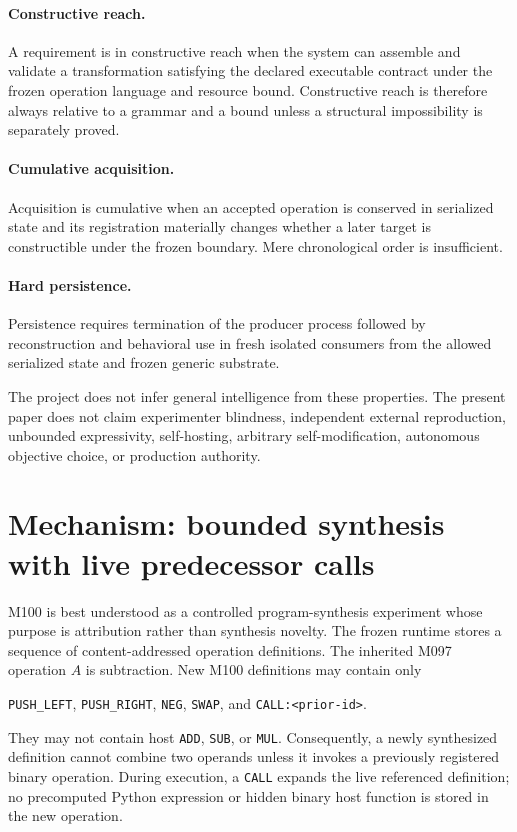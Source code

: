 \documentclass[10pt]{article}
\newcommand{\code}[1]{\texttt{#1}}
\begin{document}
\paragraph{Constructive reach.} A requirement is in constructive reach when the system can assemble and validate a transformation satisfying the declared executable contract under the frozen operation language and resource bound. Constructive reach is therefore always relative to a grammar and a bound unless a structural impossibility is separately proved.

\paragraph{Cumulative acquisition.} Acquisition is cumulative when an accepted operation is conserved in serialized state and its registration materially changes whether a later target is constructible under the frozen boundary. Mere chronological order is insufficient.

\paragraph{Hard persistence.} Persistence requires termination of the producer process followed by reconstruction and behavioral use in fresh isolated consumers from the allowed serialized state and frozen generic substrate.

The project does not infer general intelligence from these properties. The present paper does not claim experimenter blindness, independent external reproduction, unbounded expressivity, self-hosting, arbitrary self-modification, autonomous objective choice, or production authority.

\section{Mechanism: bounded synthesis with live predecessor calls}
\label{sec:mechanism}
M100 is best understood as a controlled program-synthesis experiment whose purpose is attribution rather than synthesis novelty. The frozen runtime stores a sequence of content-addressed operation definitions. The inherited M097 operation $A$ is subtraction. New M100 definitions may contain only
\begin{center}
\code{PUSH\_LEFT}, \code{PUSH\_RIGHT}, \code{NEG}, \code{SWAP}, and \code{CALL:<prior-id>}.
\end{center}
They may not contain host \code{ADD}, \code{SUB}, or \code{MUL}. Consequently, a newly synthesized definition cannot combine two operands unless it invokes a previously registered binary operation. During execution, a \code{CALL} expands the live referenced definition; no precomputed Python expression or hidden binary host function is stored in the new operation.
\end{document}
